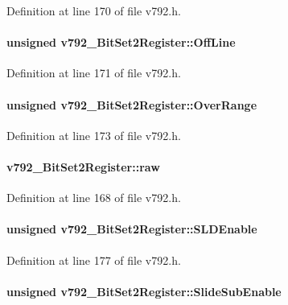 Definition at line 170 of file v792.h.
\paragraph[{OffLine}]{\setlength{\rightskip}{0pt plus 5cm}unsigned {\bf v792\_\-BitSet2Register::OffLine}}\hfill\label{unionv792__BitSet2Register_ac0c7a81f012c97f53b13e49cbfdd0676}


Definition at line 171 of file v792.h.
\paragraph[{OverRange}]{\setlength{\rightskip}{0pt plus 5cm}unsigned {\bf v792\_\-BitSet2Register::OverRange}}\hfill\label{unionv792__BitSet2Register_a48268deb519f0e7a2a67aabd3616c721}


Definition at line 173 of file v792.h.
\paragraph[{raw}]{ {\bf v792\_\-BitSet2Register::raw}}\hfill\label{unionv792__BitSet2Register_a727e1ab334c35df64fc248255fc115f7}


Definition at line 168 of file v792.h.
\paragraph[{SLDEnable}]{\setlength{\rightskip}{0pt plus 5cm}unsigned {\bf v792\_\-BitSet2Register::SLDEnable}}\hfill\label{unionv792__BitSet2Register_ac52feb0ca188f38ca132c0722f9c4c86}


Definition at line 177 of file v792.h.
\paragraph[{SlideSubEnable}]{\setlength{\rightskip}{0pt plus 5cm}unsigned {\bf v792\_\-BitSet2Register::SlideSubEnable}}\hfill\label{unionv792__BitSet2Register_a9295ae177764d135971d0cc8fecd4892}


